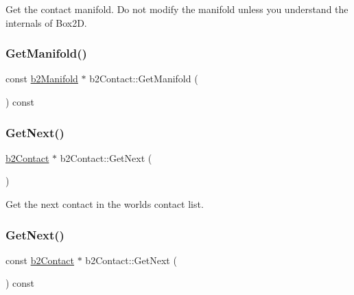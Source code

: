 Get the contact manifold. Do not modify the manifold unless you understand the internals of Box2D. \mbox{\label{classb2_contact_a4a0a4ee449a4a6fbb8c39567fa10bc2b}} 
\subsubsection{\texorpdfstring{GetManifold()}{GetManifold()}\hspace{0.1cm}{\footnotesize\ttfamily [2/2]}}
{\footnotesize\ttfamily const \mbox{\hyperlink{structb2_manifold}{b2\+Manifold}} $\ast$ b2\+Contact\+::\+Get\+Manifold (\begin{DoxyParamCaption}{ }\end{DoxyParamCaption}) const\hspace{0.3cm}{\ttfamily [inline]}}

\mbox{\label{classb2_contact_aebfebb1e4b27dc0bd7aa120093e3d650}} 
\subsubsection{\texorpdfstring{GetNext()}{GetNext()}\hspace{0.1cm}{\footnotesize\ttfamily [1/2]}}
{\footnotesize\ttfamily \mbox{\hyperlink{classb2_contact}{b2\+Contact}} $\ast$ b2\+Contact\+::\+Get\+Next (\begin{DoxyParamCaption}{ }\end{DoxyParamCaption})\hspace{0.3cm}{\ttfamily [inline]}}



Get the next contact in the world\textquotesingle{}s contact list. 

\mbox{\label{classb2_contact_a5231c6fe1b2b374ac9909a248aee0c98}} 
\subsubsection{\texorpdfstring{GetNext()}{GetNext()}\hspace{0.1cm}{\footnotesize\ttfamily [2/2]}}
{\footnotesize\ttfamily const \mbox{\hyperlink{classb2_contact}{b2\+Contact}} $\ast$ b2\+Contact\+::\+Get\+Next (\begin{DoxyParamCaption}{ }\end{DoxyParamCaption}) const\hspace{0.3cm}{\ttfamily [inline]}}

